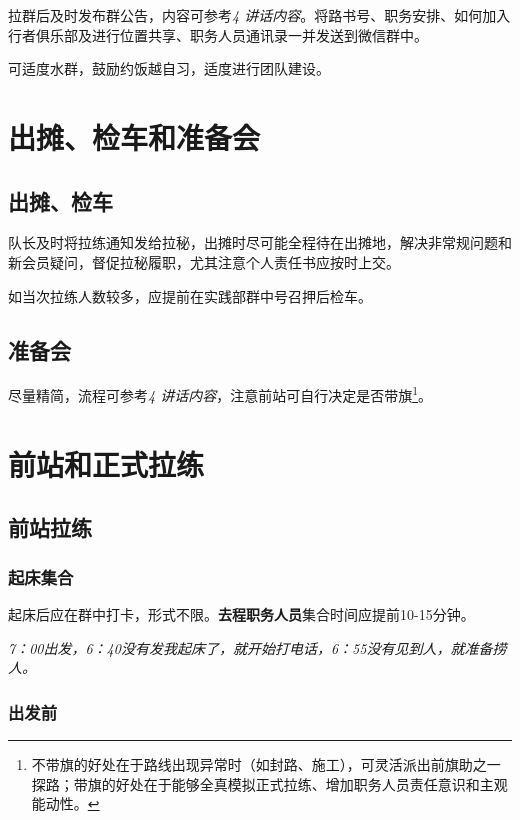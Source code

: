 \documentclass[UTF8]{ctexart}
\begin{document}
拉群后及时发布群公告，内容可参考{\color{blue}\textit{4 讲话内容}}。将路书号、职务安排、如何加入行者俱乐部及进行位置共享、职务人员通讯录一并发送到微信群中。

可适度水群，鼓励约饭越自习，适度进行团队建设。

\section{出摊、检车和准备会}

\subsection{出摊、检车}

队长及时将拉练通知发给拉秘，出摊时尽可能全程待在出摊地，解决非常规问题和新会员疑问，督促拉秘履职，尤其注意个人责任书应按时上交。

如当次拉练人数较多，应提前在实践部群中号召押后检车。

\subsection{准备会}

尽量精简，流程可参考{\color{blue}\textit{4 讲话内容}}，注意前站可自行决定是否带旗\footnote{不带旗的好处在于路线出现异常时（如封路、施工），可灵活派出前旗助之一探路；带旗的好处在于能够全真模拟正式拉练、增加职务人员责任意识和主观能动性。}。

\section{前站和正式拉练}

\subsection{前站拉练}

\subsubsection{起床集合}

起床后应在群中打卡，形式不限。\textbf{去程职务人员}集合时间应提前10-15分钟。

\textit{7：00出发，6：40没有发我起床了，就开始打电话，6：55没有见到人，就准备捞人。}

\subsubsection{出发前}
\end{document}
